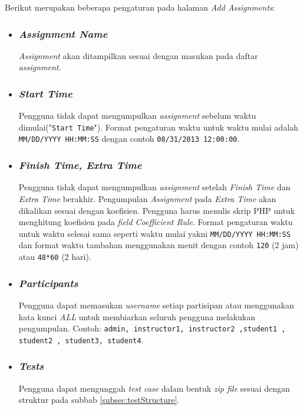 Berikut merupakan beberapa pengaturan pada halaman \textit{Add Assignments}:
\begin{itemize}
\item \subsubsection{\textit{Assignment Name}}
\textit{Assignment} akan ditampilkan sesuai dengan masukan pada daftar \textit{assignment}.

\item \subsubsection{\textit{Start Time}}
Pengguna tidak dapat mengumpulkan \textit{assignment} sebelum waktu dimulai("\texttt{Start Time}"). Format pengaturan waktu untuk waktu mulai adalah \verb|MM/DD/YYYY HH:MM:SS| dengan contoh \verb|08/31/2013 12:00:00|. 

\item \subsubsection{\textit{Finish Time, Extra Time}}
Pengguna tidak dapat mengumpulkan \textit{assignment} setelah \textit{Finish Time} dan \textit{Extra Time} berakhir. Pengumpulan \textit{Assignment} pada \textit{Extra Time} akan dikalikan sesuai dengan koefisien. Pengguna harus menulis skrip PHP untuk menghitung koefisien pada \textit{field Coefficient Rule}. Format pengaturan waktu untuk waktu selesai sama seperti waktu mulai yakni \verb|MM/DD/YYYY HH:MM:SS| dan format waktu tambahan menggunakan menit dengan contoh \verb|120| (2 jam) atau \verb|48*60| (2 hari).  

\item \subsubsection{\textit{Participants}}
Pengguna dapat memasukan \textit{username} setiap partisipan atau menggunakan kata kunci \textit{ALL} untuk membiarkan seluruh pengguna melakukan pengumpulan. Contoh: \texttt{admin, instructor1, instructor2 ,student1 , student2 , student3, student4}.

\item \subsubsection{\textit{Tests}}
Pengguna dapat mengunggah \textit{test case} dalam bentuk \textit{zip file} sesuai dengan struktur pada subbab \ref{subsec:testStructure}.


\end{itemize}
